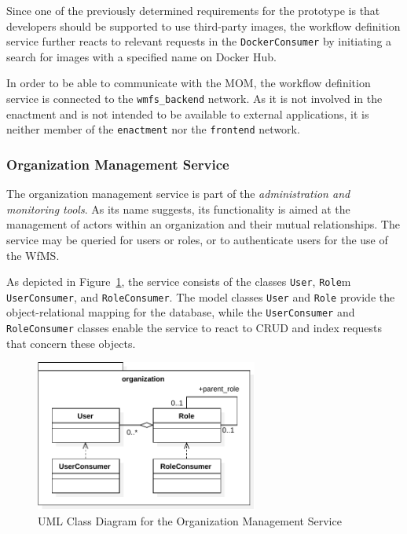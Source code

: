     Since one of the previously determined requirements for the prototype is that developers should be supported to use third-party images, the workflow definition service further reacts to relevant requests in the \texttt{DockerConsumer} by initiating a search for images with a specified name on Docker Hub.

    In order to be able to communicate with the \ac{MOM}, the workflow definition service is connected to the \texttt{wmfs\_backend} network. As it is not involved in the enactment and is not intended to be available to external applications, it is neither member of the \texttt{enactment} nor the \texttt{frontend} network.

  \subsubsection{Organization Management Service} %
    \label{subs:organization_management_service}
    The organization management service is part of the \emph{administration and monitoring tools}.
    As its name suggests, its functionality is aimed at the management of actors within an organization and their mutual relationships. The service may be queried for users or roles, or to authenticate users for the use of the \ac{WfMS}.

    As depicted in Figure~\ref{fig:uml_class_diagram_for_the_organization_service}, the service consists of the classes \texttt{User}, \texttt{Role}m \texttt{UserConsumer}, and \texttt{RoleConsumer}.
    The model classes \texttt{User} and \texttt{Role} provide the object-relational mapping for the database, while the \texttt{UserConsumer} and \texttt{RoleConsumer} classes enable the service to react to \ac{CRUD} and index requests that concern these objects.

    \begin{figure}[htbp]
      \centering
      \includegraphics[width=0.65\textwidth]{content/images/class_diagram_organization-crop.pdf}
      \caption{UML Class Diagram for the Organization Management Service}
      \label{fig:uml_class_diagram_for_the_organization_service}
    \end{figure}

